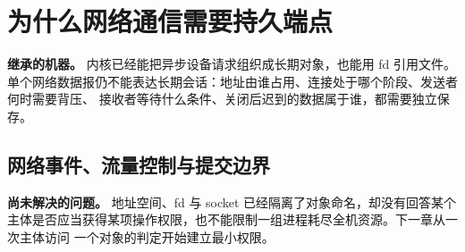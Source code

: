 \chapter{为什么网络通信需要持久端点}

\begin{statebox}
\textbf{继承的机器。} 内核已经能把异步设备请求组织成长期对象，也能用 fd 引用文件。
单个网络数据报仍不能表达长期会话：地址由谁占用、连接处于哪个阶段、发送者何时需要背压、
接收者等待什么条件、关闭后迟到的数据属于谁，都需要独立保存。
\end{statebox}


\section{网络事件、流量控制与提交边界}

\begin{problemframe}
\textbf{尚未解决的问题。} 地址空间、fd 与 socket 已经隔离了对象命名，却没有回答某个
主体是否应当获得某项操作权限，也不能限制一组进程耗尽全机资源。下一章从一次主体访问
一个对象的判定开始建立最小权限。
\end{problemframe}
